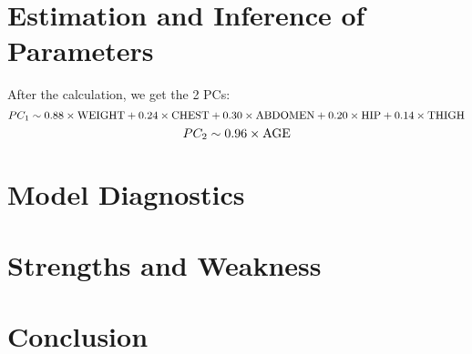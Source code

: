 \documentclass[12pt]{article}
\begin{document}
\section{\sffamily Estimation and Inference of Parameters}
After the calculation, we get the 2 PCs:
$$PC_1 \sim 0.88\times{\rm WEIGHT} + 0.24\times {\rm CHEST} + 0.30\times
 {\rm ABDOMEN} + 0.20\times {\rm HIP} + 0.14\times {\rm THIGH}$$
$$PC_2 \sim 0.96\times{\rm AGE} $$
\section{\sffamily Model Diagnostics}

\section{\sffamily Strengths and Weakness}

\section{\sffamily Conclusion}
\end{document}
